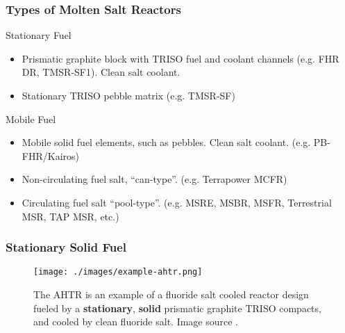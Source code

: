 \begin{frame}
        \frametitle{Types of Molten Salt Reactors}
        \begin{block}{Stationary Fuel}
                \begin{itemize}
                        \item Prismatic graphite block with TRISO fuel and 
                                coolant channels (e.g. FHR DR, TMSR-SF1). Clean salt 
                                coolant.
                        \item Stationary TRISO pebble matrix (e.g. TMSR-SF)
                \end{itemize}

        \end{block}
        \begin{block}{Mobile Fuel}
                \begin{itemize}
                        \item Mobile solid fuel elements, such as pebbles. 
                                Clean salt coolant. (e.g. PB-FHR/Kairos)
                        \item Non-circulating fuel salt, ``can-type''. (e.g. Terrapower MCFR)
                        \item Circulating fuel salt ``pool-type''. (e.g. MSRE, MSBR, MSFR, 
                                Terrestrial MSR, TAP MSR, etc.)
                \end{itemize}
        \end{block}
\end{frame}

\begin{frame}
        \frametitle{Stationary Solid Fuel}
               \begin{figure}[t]
                \vspace*{-0.1in}
                \texttt{[image: ./images/example-ahtr.png]}
                       \caption{The \gls{AHTR} \cite{forsberg_fuel_2004} 
                       is an example of a fluoride salt cooled reactor 
                       design fueled by a \textbf{stationary}, \textbf{solid} 
                       prismatic graphite TRISO compacts, and cooled by clean fluoride salt.
                       Image source \cite{gentry_burnable_2015}. }
               \end{figure}            
\end{frame}


